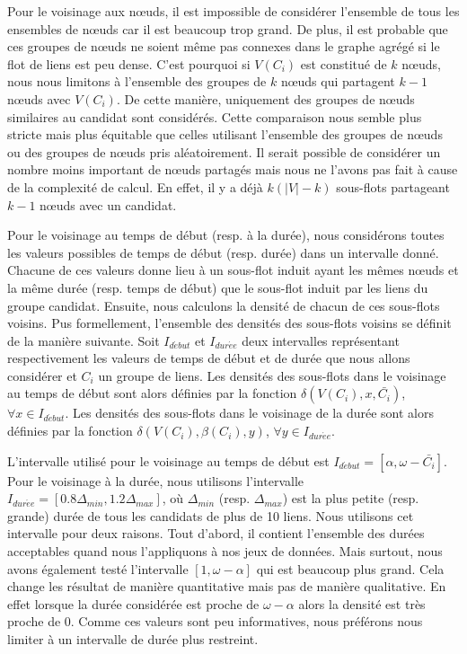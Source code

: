 Pour le voisinage aux n\oe{}uds, il est impossible de considérer l'ensemble de tous les ensembles de n\oe{}uds car il est beaucoup trop grand.
De plus, il est probable que ces groupes de n\oe{}uds ne soient même pas connexes dans le graphe agrégé si le flot de liens est peu dense.
C'est pourquoi si $V(C_i)$ est constitué de $k$ n\oe{}uds, nous nous limitons à l'ensemble des groupes de $k$ n\oe{}uds qui partagent $k-1$ n\oe{}uds avec $V(C_i)$.
De cette manière, uniquement des groupes de n\oe{}uds similaires au candidat sont considérés.
Cette comparaison nous semble plus stricte mais plus équitable que celles utilisant l'ensemble des groupes de n\oe{}uds ou des groupes de n\oe{}uds pris aléatoirement.
Il serait possible de considérer un nombre moins important de n\oe{}uds partagés mais nous ne l'avons pas fait à cause de la complexité de calcul.
En effet, il y a déjà $k(|V|-k)$ sous-flots partageant $k-1$ n\oe{}uds avec un candidat.

Pour le voisinage au temps de début (resp. à la durée), nous considérons toutes les valeurs possibles de temps de début (resp. durée) dans un intervalle donné.
Chacune de ces valeurs donne lieu à un sous-flot induit ayant les mêmes n\oe{}uds et la même durée (resp. temps de début) que le sous-flot induit par les liens du groupe candidat.
Ensuite, nous calculons la densité de chacun de ces sous-flots voisins.
Pus formellement, l'ensemble des densités des sous-flots voisins se définit de la manière suivante.
Soit $I_{d\acute{e}but}$ et $I_{dur\acute{e}e}$ deux intervalles représentant respectivement les valeurs de temps de début et de durée que nous allons considérer et $C_i$ un groupe de liens.
Les densités des sous-flots dans le voisinage au temps de début sont alors définies par la fonction $\delta(V(C_i),x, \bar{C_i})$, $\forall x \in I_{d\acute{e}but}$.
Les densités des sous-flots dans le voisinage de la durée sont alors définies par la fonction $\delta(V(C_i),\beta(C_i), y)$, $\forall y \in I_{dur\acute{e}e}$.

L'intervalle utilisé pour le voisinage au temps de début est $I_{d\acute{e}but}=[\alpha, \omega-\bar{C_i}]$.
Pour le voisinage à la durée, nous utilisons l'intervalle $I_{dur\acute{e}e}=[0.8\Delta_{min}, 1.2\Delta_{max}]$, où $\Delta_{min}$ (resp. $\Delta_{max}$) est la plus petite (resp. grande) durée de tous les candidats de plus de 10 liens.
Nous utilisons cet intervalle pour deux raisons.
Tout d'abord, il contient l'ensemble des durées acceptables quand nous l'appliquons à nos jeux de données.
Mais surtout, nous avons également testé l'intervalle $[1,\omega-\alpha]$ qui est beaucoup plus grand.
Cela change les résultat de manière quantitative mais pas de manière qualitative.
En effet lorsque la durée considérée est proche de $\omega-\alpha$ alors la densité est très proche de $0$.
Comme ces valeurs sont peu informatives, nous préférons nous limiter à un intervalle de durée plus restreint.
\bigskip

